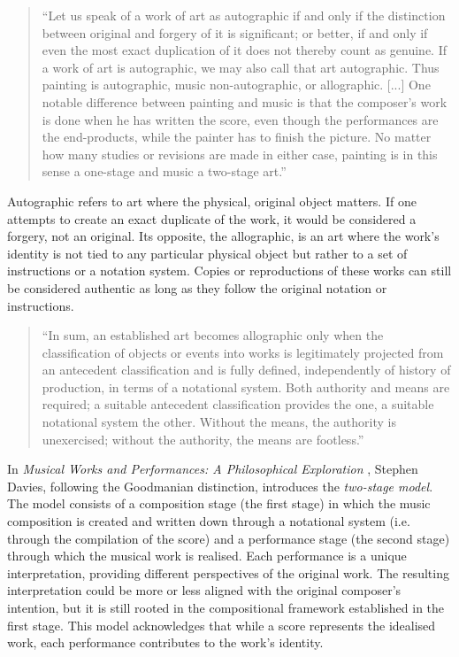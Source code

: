 \begin{quote}
    “Let us speak of a work of art as autographic if and only if the distinction between original and forgery of it is significant; or better, if and only if even the most exact duplication of it does not thereby count as genuine. If a work of art is autographic, we may also call that art autographic. Thus painting is autographic, music non-autographic, or allographic. [...] One notable difference between painting and music is that the composer’s work is done when he has written the score, even though the performances are the end-products, while the painter has to finish the picture. No matter how many studies or revisions are made in either case, painting is in this sense a one-stage and music a two-stage art.” \cite{goodman1968languages}
\end{quote}
Autographic refers to art where the physical, original object matters. If one attempts to create an exact duplicate of the work, it would be considered a forgery, not an original. Its opposite, the allographic, is an art where the work’s identity is not tied to any particular physical object but rather to a set of instructions or a notation system. Copies or reproductions of these works can still be considered authentic as long as they follow the original notation or instructions.
\begin{quote}
    “In sum, an established art becomes allographic only when the classification of objects or events into works is legitimately projected from an antecedent classification and is fully defined, independently of history of production, in terms of a notational system. Both authority and means are required; a suitable antecedent classification provides the one, a suitable notational system the other. Without the means, the authority is unexercised; without the authority, the means are footless.” \cite{goodman1968languages}
\end{quote}
In \textit{Musical Works and Performances: A Philosophical Exploration} \cite{davies2001musical}, Stephen Davies, following the Goodmanian distinction, introduces the \textit{two-stage model}. The model consists of a composition stage (the first stage) in which the music composition is created and written down through a notational system (i.e. through the compilation of the score) and a performance stage (the second stage) through which the musical work is realised. Each performance is a unique interpretation, providing different perspectives of the original work. The resulting interpretation could be more or less aligned with the original composer’s intention, but it is still rooted in the compositional framework established in the first stage. This model acknowledges that while a score represents the idealised work, each performance contributes to the work’s identity.\\
